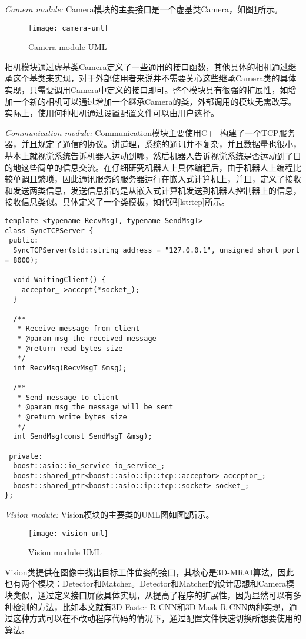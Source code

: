 \emph{Camera module:}
Camera模块的主要接口是一个虚基类Camera，如图\ref{fig:camera-uml}所示。
\begin{figure}[ht]
  \centering
  \texttt{[image: camera-uml]}
  \caption{Camera module UML}
  \label{fig:camera-uml}
\end{figure}
相机模块通过虚基类Camera定义了一些通用的接口函数，其他具体的相机通过继承这个基类来实现，对于外部使用者来说并不需要关心这些继承Camera类的具体实现，只需要调用Camera中定义的接口即可。整个模块具有很强的扩展性，如增加一个新的相机可以通过增加一个继承Camera的类，外部调用的模块无需改写。实际上，使用何种相机通过设置配置文件可以由用户选择。

\emph{Communication module:}
Communication模块主要使用C++构建了一个TCP服务器，并且规定了通信的协议。讲道理，系统的通讯并不复杂，并且数据量也很小，基本上就视觉系统告诉机器人运动到哪，然后机器人告诉视觉系统是否运动到了目的地这些简单的信息交流。在仔细研究机器人上具体编程后，由于机器人上编程比较单调且繁琐，因此通讯服务的服务器运行在嵌入式计算机上，并且，定义了接收和发送两类信息，发送信息指的是从嵌入式计算机发送到机器人控制器上的信息，接收信息类似。具体定义了一个类模板，如代码\ref{lst:tcp}所示。
\begin{lstlisting}[caption=TCP server template, label=lst:tcp]
template <typename RecvMsgT, typename SendMsgT>
class SyncTCPServer {
 public:
  SyncTCPServer(std::string address = "127.0.0.1", unsigned short port = 8000);

  void WaitingClient() {
    acceptor_->accept(*socket_);
  }

  /**
   * Receive message from client
   * @param msg the received message
   * @return read bytes size
   */
  int RecvMsg(RecvMsgT &msg);

  /**
   * Send message to client
   * @param msg the message will be sent
   * @return write bytes size
   */
  int SendMsg(const SendMsgT &msg);

 private:
  boost::asio::io_service io_service_;
  boost::shared_ptr<boost::asio::ip::tcp::acceptor> acceptor_;
  boost::shared_ptr<boost::asio::ip::tcp::socket> socket_;
};
\end{lstlisting}

\emph{Vision module:}
Vision模块的主要类的UML图如图\ref{fig:vision-uml}所示。
\begin{figure}[ht]
  \centering
  \texttt{[image: vision-uml]}
  \caption{Vision module UML}
  \label{fig:vision-uml}
\end{figure}
Vision类提供在图像中找出目标工件位姿的接口，其核心是3D-MRAI算法，因此也有两个模块：Detector和Matcher。Detector和Matcher的设计思想和Camera模块类似，通过定义接口屏蔽具体实现，从提高了程序的扩展性，因为显然可以有多种检测的方法，比如本文就有3D Faster R-CNN和3D Mask R-CNN两种实现，通过这种方式可以在不改动程序代码的情况下，通过配置文件快速切换所想要使用的算法。

